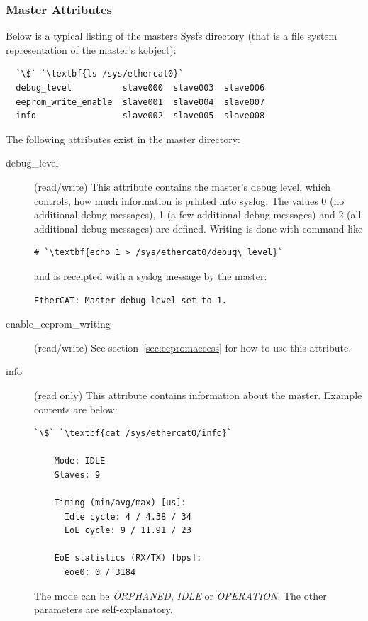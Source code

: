 \documentclass[a4paper,12pt,BCOR6mm,bibtotoc,idxtotoc]{scrbook}
\begin{document}
\subsubsection{Master Attributes}
\label{sec:sysfs-master}

Below is a typical listing of the masters Sysfs directory (that is a
file system representation of the master's kobject):

\begin{lstlisting}
  `\$` `\textbf{ls /sys/ethercat0}`
  debug_level          slave000  slave003  slave006
  eeprom_write_enable  slave001  slave004  slave007
  info                 slave002  slave005  slave008
\end{lstlisting}

The following attributes exist in the master directory:

\begin{description}
\item[debug\_level] (read/write) This attribute contains the master's
  debug level, which controls, how much information is printed into
  syslog. The values 0 (no additional debug messages), 1 (a few
  additional debug messages) and 2 (all additional debug messages) are
  defined. Writing is done with command like

  \begin{lstlisting}[gobble=4]
    # `\textbf{echo 1 > /sys/ethercat0/debug\_level}`
  \end{lstlisting}

  and is receipted with a syslog message by the master:

  \begin{lstlisting}[gobble=4]
    EtherCAT: Master debug level set to 1.
  \end{lstlisting}

\item[enable\_eeprom\_writing] (read/write) See
  section~\ref{sec:eepromaccess} for how to use this attribute.

\item[info] (read only) This attribute contains information about the
  master. Example contents are below:

  \begin{lstlisting}[gobble=4]
    `\$` `\textbf{cat /sys/ethercat0/info}`

    Mode: IDLE
    Slaves: 9

    Timing (min/avg/max) [us]:
      Idle cycle: 4 / 4.38 / 34
      EoE cycle: 9 / 11.91 / 23

    EoE statistics (RX/TX) [bps]:
      eoe0: 0 / 3184
  \end{lstlisting}

  The mode can be \textit{ORPHANED}, \textit{IDLE} or
  \textit{OPERATION}. The other parameters are self-explanatory.

\end{description}
\end{document}
